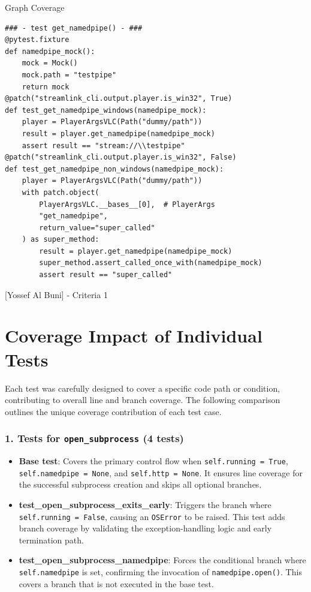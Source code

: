 \documentclass[a4paper]{scrreprt}
\newcounter{question}
\begin{document}
\begin{question}{Graph Coverage}
\begin{enumerate}[topsep=0pt, leftmargin=*]
\begin{answer}
\begin{lstlisting}[style=pythongrey]
### - test get_namedpipe() - ###
@pytest.fixture
def namedpipe_mock():
    mock = Mock()
    mock.path = "testpipe"
    return mock
@patch("streamlink_cli.output.player.is_win32", True)
def test_get_namedpipe_windows(namedpipe_mock):
    player = PlayerArgsVLC(Path("dummy/path"))
    result = player.get_namedpipe(namedpipe_mock)
    assert result == "stream://\\testpipe"
@patch("streamlink_cli.output.player.is_win32", False)
def test_get_namedpipe_non_windows(namedpipe_mock):
    player = PlayerArgsVLC(Path("dummy/path"))
    with patch.object(
        PlayerArgsVLC.__bases__[0],  # PlayerArgs
        "get_namedpipe",
        return_value="super_called"
    ) as super_method:
        result = player.get_namedpipe(namedpipe_mock)
        super_method.assert_called_once_with(namedpipe_mock)
        assert result == "super_called"
             \end{lstlisting}

[Yossef Al Buni] - Criteria 1 \\
\section*{Coverage Impact of Individual Tests}

Each test was carefully designed to cover a specific code path or condition, contributing to overall line and branch coverage. The following comparison outlines the unique coverage contribution of each test case.

\subsubsection*{1. Tests for \texttt{open\_subprocess} (4 tests)}

\begin{itemize}
    \item \textbf{Base test}: Covers the primary control flow when \texttt{self.running = True}, \texttt{self.namedpipe = None}, and \texttt{self.http = None}. It ensures line coverage for the successful subprocess creation and skips all optional branches.
    
    \item \textbf{test\_open\_subprocess\_exits\_early}: Triggers the branch where \texttt{self.running = False}, causing an \texttt{OSError} to be raised. This test adds branch coverage by validating the exception-handling logic and early termination path.

    \item \textbf{test\_open\_subprocess\_namedpipe}: Forces the conditional branch where \texttt{self.namedpipe} is set, confirming the invocation of \texttt{namedpipe.open()}. This covers a branch that is not executed in the base test.


\end{itemize}
\end{answer}
\end{enumerate}
\end{question}
\end{document}
